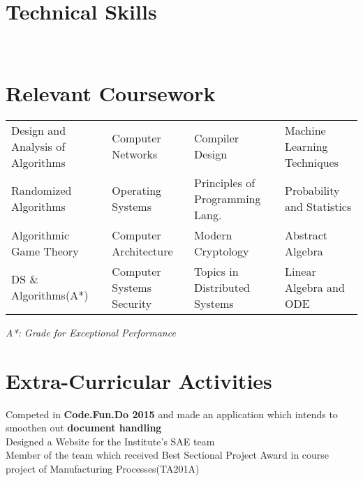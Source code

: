 \documentclass[a4paper]{norm-resume}
\begin{document}
\vspace{2mm}    %


\section{Technical Skills \hrulefill}

 \hfill {} \\
 \hfill {}

\vspace{2mm}    %


\section{Relevant Coursework \hrulefill}

\begin{table}[h!]
    \small
    \vspace{-\topsep}
    \begin{tabular}{l l l l}
        Design and Analysis of Algorithms
        & Computer Networks
        & Compiler Design
        & Machine Learning Techniques \\
        Randomized Algorithms
        & Operating Systems
        & Principles of Programming Lang.
        & Probability and Statistics \\
        Algorithmic Game Theory
        & Computer Architecture
        & Modern Cryptology
        & Abstract Algebra \\
        DS \& Algorithms(A*)
        & Computer Systems Security
        & Topics in Distributed Systems
        & Linear Algebra and ODE \\
    \end{tabular}
    \vspace{-\topsep}
\end{table}
\hfill \small
\textit{A*: Grade for Exceptional Performance}

\normalsize

\vspace{-2mm}    %


\section{Extra-Curricular Activities \hrulefill}
Competed in \textbf{Code.Fun.Do 2015} and made an application which intends to smoothen out \textbf{document handling} \\
Designed a Website for the Institute’s SAE team \\
Member of the team which received Best Sectional Project Award in course project of Manufacturing Processes(TA201A)
\end{document}
